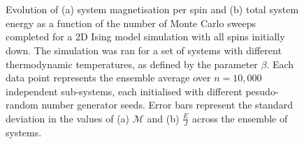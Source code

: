 \documentclass[11pt]{iopart}
\begin{document}
\begin{figure}[t]
  \centering
  \\
    \\
  \caption{Evolution of (a) system magnetisation per spin and (b) total system energy as a function of the number of Monte Carlo sweeps completed for a 2D Ising model simulation with all spins initially down. The simulation was ran for a set of systems with different thermodynamic temperatures, as defined by the parameter $\beta$. Each data point represents the ensemble average over $n = 10,000$ independent sub-systems, each initialised with different pesudo-random number generator seeds. Error bars represent the standard deviation in the values of (a) $\mathcal{M}$ and (b) $\frac{E}{J}$ across the ensemble of systems.}
  \label{fig:convergencegraphs}
\end{figure}
\end{document}
